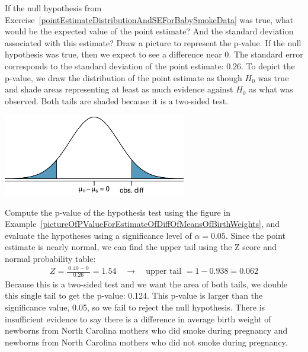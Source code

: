 \begin{example}{If the null hypothesis from Exercise~\ref{pointEstimateDistributionAndSEForBabySmokeData} was true, what would be the expected value of the point estimate? And the standard deviation associated with this estimate? Draw a picture to represent the p-value.} \label{pictureOfPValueForEstimateOfDiffOfMeansOfBirthWeights}
If the null hypothesis was true, then we expect to see a difference near 0. The standard error corresponds to the standard deviation of the point estimate: 0.26. To depict the p-value, we draw the distribution of the point estimate as though $H_0$ was true and shade areas representing at least as much evidence against $H_0$ as what was observed. Both tails are shaded because it is a two-sided test.
\begin{center}
\includegraphics[width=0.6\textwidth]{05/figures/distOfDiffOfSampleMeansForBWOfBabySmokeData/distOfDiffOfSampleMeansForBWOfBabySmokeData}
\end{center}
\end{example}

\begin{example}{Compute the p-value of the hypothesis test using the figure in Example~\ref{pictureOfPValueForEstimateOfDiffOfMeansOfBirthWeights}, and evaluate the hypotheses using a significance level of $\alpha=0.05$.} \label{babySmokeHTForWeightComputePValueAndEvalHT}
Since the point estimate is nearly normal, we can find the upper tail using the Z score and normal probability table:
\begin{eqnarray*}
Z = \frac{\ 0.40 - 0\ }{0.26} = 1.54 \quad \to \quad \text{upper tail } = 1 - 0.938 = 0.062
\end{eqnarray*}
Because this is a two-sided test and we want the area of both tails, we double this single tail to get the p-value: 0.124. This p-value is larger than the significance value, 0.05, so we fail to reject the null hypothesis. There is insufficient evidence to say there is a difference in average birth weight of newborns from North Carolina mothers who did smoke during pregnancy and newborns from North Carolina mothers who did not smoke during pregnancy.
\end{example}


